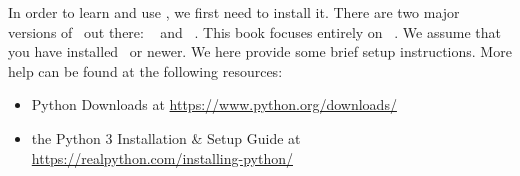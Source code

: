 %
\label{sec:installingPython}%
In order to learn and use \python, we first need to install it.
There are two major versions of \python\ out there: \python~ and \python~.
This book focuses entirely on \python~.
We assume that you have installed \pythonWithVersion\ or newer.
We here provide some brief setup instructions.
More help can be found at the following resources:%
%
\begin{itemize}%
\item Python Downloads at \url{https://www.python.org/downloads/}%
\item the Python 3 Installation \& Setup Guide at \url{https://realpython.com/installing-python/}%
\end{itemize}%
%
%
\FloatBarrier%
%
\FloatBarrier%
%
\endhsection%
%
